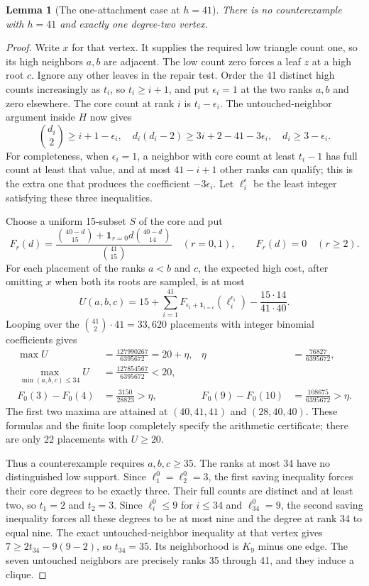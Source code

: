 \documentclass[11pt,a4paper]{article}
\newtheorem{lemma}[theorem]{Lemma}
\theoremstyle{definition}\newtheorem{definition}[theorem]{Definition}
\theoremstyle{remark}\newtheorem{remark}[theorem]{Remark}
\begin{document}
\begin{lemma}[The one-attachment case at $h=41$]\label{paired:h41}
There is no counterexample with $h=41$ and exactly one degree-two vertex.
\end{lemma}
\begin{proof}
Write $x$ for that vertex. It supplies the required low triangle count
one, so its high neighbors $a,b$ are adjacent. The low count zero
forces a leaf $z$ at a high root $c$. Ignore any other leaves in the
repair test. Order the 41 distinct high counts increasingly as $t_i$,
so $t_i\ge i+1$, and put $\epsilon_i=1$ at the two ranks $a,b$ and
zero elsewhere. The core count at rank $i$ is $t_i-\epsilon_i$.
The untouched-neighbor argument inside $H$ now gives
\[
 \binom{d_i}{2}\ge i+1-\epsilon_i,\quad
 d_i(d_i-2)\ge3i+2-41-3\epsilon_i,\quad d_i\ge3-\epsilon_i.
\]
For completeness, when $\epsilon_i=1$, a neighbor with core count
at least $t_i-1$ has full count at least that value, and at most
$41-i+1$ other ranks can qualify; this is the extra one that produces
the coefficient $-3\epsilon_i$. Let $\ell_i^{\epsilon}$ be the
least integer satisfying these three inequalities.

Choose a uniform 15-subset $S$ of the core and put
\[
 F_r(d)=\frac{\binom{40-d}{15}+\mathbf1_{r=0}d\binom{40-d}{14}}
                    {\binom{41}{15}}\quad(r=0,1),
 \qquad F_r(d)=0\quad(r\ge2).
\]
For each placement of the ranks $a<b$ and $c$, the expected high
cost, after omitting $x$ when both its roots are sampled, is at most
\begin{equation}\label{paired:U41}
 U(a,b,c)=15+\sum_{i=1}^{41}
 F_{\epsilon_i+\mathbf1_{i=c}}(\ell_i^{\epsilon_i})
 -\frac{15\cdot14}{41\cdot40}.
\end{equation}
Looping over the $\binom{41}{2}\cdot41=33,620$ placements with integer
binomial coefficients gives
\begin{align*}
 \max U&=\frac{127990267}{6395672}=20+\eta,
       &\eta&=\frac{76827}{6395672},\\
 \max_{\min(a,b,c)\le34}U&=\frac{127854567}{6395672}<20,\\
 F_0(3)-F_0(4)&=\frac{3150}{28823}>\eta,
 &F_0(9)-F_0(10)&=\frac{108675}{6395672}>\eta.
\end{align*}
The first two maxima are attained at $(40,41,41)$ and $(28,40,40)$.
These formulas and the finite loop completely specify the arithmetic
certificate; there are only 22 placements with $U\ge20$.

Thus a counterexample requires $a,b,c\ge35$. The ranks at most 34
have no distinguished low support. Since $\ell_1^0=\ell_2^0=3$,
the first saving inequality forces their core degrees to be exactly
three. Their full counts are distinct and at least two, so $t_1=2$
and $t_2=3$. Since $\ell_i^0\le9$ for $i\le34$ and
$\ell_{34}^0=9$, the second saving inequality forces all these
degrees to be at most nine and the degree at rank 34 to equal nine.
The exact untouched-neighbor inequality at that vertex gives
$7\ge2t_{34}-9(9-2)$, so $t_{34}=35$. Its neighborhood is $K_9$
minus one edge. The seven untouched neighbors are precisely ranks
35 through 41, and they induce a clique.


\end{proof}
\end{document}
